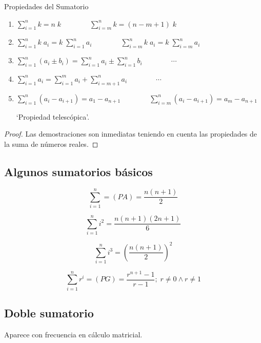 \begin{prop}{Propiedades del Sumatorio}
\begin{enumerate}
\item $\displaystyle \sum_{i=1}^n k=n\; k \qquad \qquad \sum_{i=m}^n k =(n-m+1)\; k$	
\item  $\displaystyle \sum_{i=1}^n k\; a_i= k\; \sum_{i=1}^n a_i \qquad \qquad \sum_{i=m}^n k\; a_i = k\; \sum_{i=m}^n a_i$
\item $\displaystyle \sum_{i=1}^n  (a_i\pm b_i)=\sum_{i=1}^n a_i \pm \sum_{i=1}^n b_i \qquad \qquad \cdots$
\item $\displaystyle  \sum_{i=1}^n a_i= \sum_{i=1}^m a_i + \sum_{i=m+1}^n a_i  \qquad \qquad \cdots $
\item $\displaystyle \sum_{i=1}^n (a_i-a_{i+1})=a_1-a_{n+1} \qquad \qquad 
\sum_{i=m}^n (a_i-a_{i+1})=a_m-a_{n+1}$ 

`Propiedad telescópica'.
\end{enumerate}	
\end{prop}
\begin{proof}
Las demostraciones son inmediatas teniendo en cuenta las propiedades de la suma de números reales.	
\end{proof}

\subsection{Algunos sumatorios básicos}
\begin{multicols}{2}
\begin{equation*}
	 \sum_{i=1}^n =(PA)= \dfrac {n(n+1)}{2}
\end{equation*}

\begin{equation*}
	 \sum_{i=1}^n i^2=\dfrac {n(n+1)(2n+1)}{6}
\end{equation*}

\begin{equation*}
	\sum_{i=1}^n i^3 = \left( \dfrac {n(n+1)}{2} \right) ^2
\end{equation*}

\begin{equation*}
	 \sum_{i=1}^n r^i=(PG)=\dfrac {r^{n+1}-1}{r-1}; \; r\neq 0 \wedge r\neq 1
\end{equation*}
\end{multicols}

\subsection{Doble sumatorio} Aparece con frecuencia en cálculo matricial.

